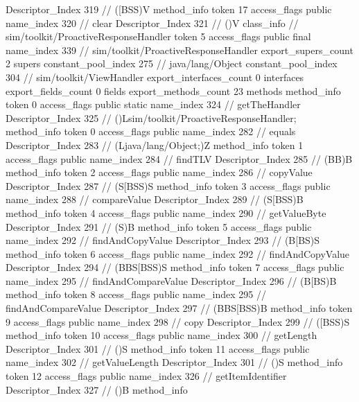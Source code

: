 {{{{{					Descriptor_Index	319		// ([BSS)V
				}
				method_info {
					token	17
					access_flags	public
					name_index	320		// clear
					Descriptor_Index	321		// ()V
				}
			}
		}
		class_info {		// sim/toolkit/ProactiveResponseHandler
			token	5
			access_flags	public final
			name_index	339		// sim/toolkit/ProactiveResponseHandler
			export_supers_count	2
			supers {
				constant_pool_index	275		// java/lang/Object
				constant_pool_index	304		// sim/toolkit/ViewHandler
			}
			export_interfaces_count	0
			interfaces {
			}
			export_fields_count	0
			fields {
			}
			export_methods_count	23
			methods {
				method_info {
					token	0
					access_flags	public static
					name_index	324		// getTheHandler
					Descriptor_Index	325		// ()Lsim/toolkit/ProactiveResponseHandler;
				}
				method_info {
					token	0
					access_flags	public
					name_index	282		// equals
					Descriptor_Index	283		// (Ljava/lang/Object;)Z
				}
				method_info {
					token	1
					access_flags	public
					name_index	284		// findTLV
					Descriptor_Index	285		// (BB)B
				}
				method_info {
					token	2
					access_flags	public
					name_index	286		// copyValue
					Descriptor_Index	287		// (S[BSS)S
				}
				method_info {
					token	3
					access_flags	public
					name_index	288		// compareValue
					Descriptor_Index	289		// (S[BSS)B
				}
				method_info {
					token	4
					access_flags	public
					name_index	290		// getValueByte
					Descriptor_Index	291		// (S)B
				}
				method_info {
					token	5
					access_flags	public
					name_index	292		// findAndCopyValue
					Descriptor_Index	293		// (B[BS)S
				}
				method_info {
					token	6
					access_flags	public
					name_index	292		// findAndCopyValue
					Descriptor_Index	294		// (BBS[BSS)S
				}
				method_info {
					token	7
					access_flags	public
					name_index	295		// findAndCompareValue
					Descriptor_Index	296		// (B[BS)B
				}
				method_info {
					token	8
					access_flags	public
					name_index	295		// findAndCompareValue
					Descriptor_Index	297		// (BBS[BSS)B
				}
				method_info {
					token	9
					access_flags	public
					name_index	298		// copy
					Descriptor_Index	299		// ([BSS)S
				}
				method_info {
					token	10
					access_flags	public
					name_index	300		// getLength
					Descriptor_Index	301		// ()S
				}
				method_info {
					token	11
					access_flags	public
					name_index	302		// getValueLength
					Descriptor_Index	301		// ()S
				}
				method_info {
					token	12
					access_flags	public
					name_index	326		// getItemIdentifier
					Descriptor_Index	327		// ()B
				}
				method_info {
}}}}}
